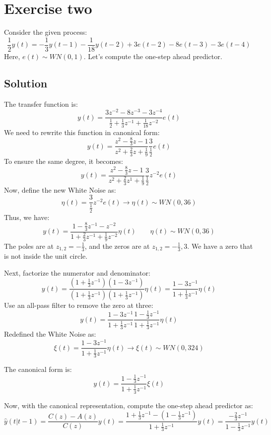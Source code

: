 \section{Exercise two}

Consider the given process:
\[\dfrac{1}{2}y(t)=-\dfrac{1}{3}y(t-1)-\dfrac{1}{18}y(t-2)+3e(t-2)-8e(t-3)-3e(t-4)\]
Here, $e(t)\sim WN(0,1)$. 
Let's compute the one-step ahead predictor.

\subsection*{Solution}
The transfer function is:
\[y(t)=\dfrac{3z^{-2}-8z^{-3}-3z^{-4}}{\frac{1}{2}+\frac{1}{3}z^{-1}+\frac{1}{18}z^{-2}}e(t)\]
We need to rewrite this function in canonical form:
\[y(t)=\dfrac{z^{2}-\frac{8}{3}z-1}{z^2+\frac{2}{3}z+\frac{1}{9}}\frac{3}{\frac{1}{2}}e(t)\]
To ensure the same degree, it becomes:
\[y(t)=\dfrac{z^{2}-\frac{8}{3}z-1}{z^2+\frac{2}{3}z^1+\frac{1}{9}}\frac{3}{\frac{1}{2}}z^{-2}e(t)\]
Now, define the new  White Noise as:
\[\eta(t)=\frac{3}{\frac{1}{2}}z^{-2}e(t)\rightarrow \eta(t)\sim WN\left(0,36\right)\]
Thus, we have:
\[y(t)=\dfrac{1-\frac{8}{3}z^{-1}-z^{-2}}{1+\frac{2}{3}z^{-1}+\frac{1}{9}z^{-2}}\eta(t) \qquad \eta(t)\sim WN\left(0,36\right)\]
The poles are at $z_{1,2}=-\frac{1}{3}$, and the zeros are at $z_{1,2}=-\frac{1}{3},3$. 
We have a zero that is not inside the unit circle.

Next, factorize the numerator and denominator:
\[y(t)=\dfrac{\left(1+\frac{1}{3}z^{-1}\right)\left(1-3z^{-1}\right)}{\left(1+\frac{1}{3}z^{-1}\right)\left(1+\frac{1}{3}z^{-1}\right)}\eta(t)=\dfrac{1-3z^{-1}}{1+\frac{1}{3}z^{-1}}\eta(t) \]
Use an all-pass filter to remove the zero at three:
\[y(t)=\dfrac{1-3z^{-1}}{1+\frac{1}{3}z^{-1}}\dfrac{1-\frac{1}{3}z^{-1}}{1+\frac{1}{3}z^{-1}}\eta(t)\]
Redefined the  White Noise as:
\[\xi(t)=\dfrac{1-3z^{-1}}{1+\frac{1}{3}z^{-1}}\eta(t)\rightarrow \xi(t)\sim WN(0,324)\]

The canonical form is:
\[y(t)=\dfrac{1-\frac{1}{3}z^{-1}}{1+\frac{1}{3}z^{-1}}\xi(t)\]

Now, with the canonical representation, compute the one-step ahead predictor as:
\[\hat{y}(t|t-1)=\dfrac{C(z)-A(z)}{C(z)}y(t)=\dfrac{1+\frac{1}{3}z^{-1}-\left(1-\frac{1}{3}z^{-1}\right)}{1+\frac{1}{3}z^{-1}}y(t)=\dfrac{-\frac{2}{3}z^{-1}}{1-\frac{1}{3}z^{-1}}y(t)\]